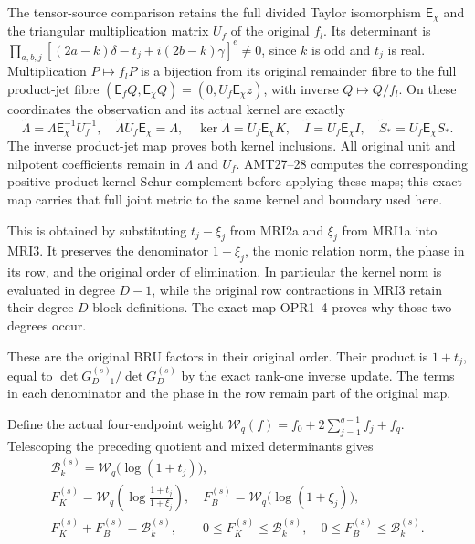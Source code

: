 \documentclass[11pt,a4paper]{article}
\begin{document}
The tensor-source comparison retains the full divided Taylor
isomorphism $\mathsf E_\chi$ and the triangular multiplication
matrix $U_f$ of the original $f_l$. Its determinant is
$\prod_{a,b,j}[(2a-k)\delta-t_j+i(2b-k)\gamma]^e\ne0$,
since $k$ is odd and $t_j$ is real. Multiplication
$P\mapsto f_lP$ is a bijection from its original remainder
fibre to the full product-jet fibre
$(\mathsf E_fQ,\mathsf E_\chi Q)=(0,U_f\mathsf E_\chi z)$,
with inverse $Q\mapsto Q/f_l$. On these coordinates the
observation and its actual kernel are exactly
\[
 \widetilde\Lambda=\Lambda\mathsf E_\chi^{-1}U_f^{-1},\quad
 \widetilde\Lambda U_f\mathsf E_\chi=\Lambda,\quad
 \ker\widetilde\Lambda=U_f\mathsf E_\chi K,\quad
 \widetilde I=U_f\mathsf E_\chi I,\quad
 \widetilde S_*=U_f\mathsf E_\chi S_*.
 \tag{MRI3c}
\]
The inverse product-jet map proves both kernel inclusions.
All original unit and nilpotent coefficients remain in
$\Lambda$ and $U_f$. AMT27--28 computes the corresponding
positive product-kernel Schur complement before applying
these maps; this exact map carries that full joint metric
to the same kernel and boundary used here.

This is obtained by substituting $t_j-\xi_j$ from MRI2a and
$\xi_j$ from MRI1a into MRI3. It preserves the denominator
$1+\xi_j$, the monic relation norm, the phase in its row, and
the original order of elimination. In particular the kernel
norm is evaluated in degree $D-1$, while the original row
contractions in MRI3 retain their degree-$D$ block definitions.
The exact map OPR1--4 proves why those two degrees occur.

These are the original BRU factors in their original order. Their
product is $1+t_j$, equal to
$\det G_{D-1}^{(s)}/\det G_D^{(s)}$ by the exact rank-one
inverse update. The terms in each denominator and the phase in
the row remain part of the original map.

Define the actual four-endpoint weight
$\mathcal W_q(f)=f_0+2\sum_{j=1}^{q-1}f_j+f_q$. Telescoping
the preceding quotient and mixed determinants gives
\[
\begin{gathered}
 \mathcal B_k^{(s)}=\mathcal W_q\bigl(\log(1+t_j)\bigr),\\
 F_K^{(s)}=\mathcal W_q\left(\log\frac{1+t_j}{1+\xi_j}\right),
 \quad F_B^{(s)}=\mathcal W_q\bigl(\log(1+\xi_j)\bigr),\\
 F_K^{(s)}+F_B^{(s)}=\mathcal B_k^{(s)},\qquad
 0\le F_K^{(s)}\le\mathcal B_k^{(s)},\quad
 0\le F_B^{(s)}\le\mathcal B_k^{(s)}.
\end{gathered}\tag{MRI4}
\]
\end{document}
